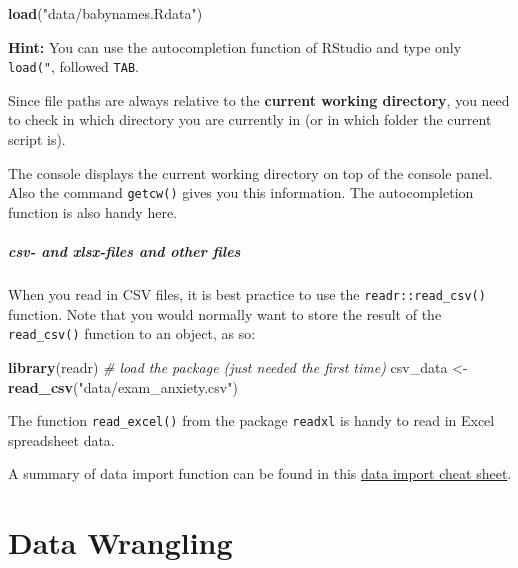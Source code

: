 \documentclass[
]{scrartcl}
\makeatletter
\newenvironment{Shaded}{\begin{snugshade}}{\end{snugshade}}
\newcommand{\CommentTok}[1]{\textcolor[rgb]{0.56,0.35,0.01}{\textit{#1}}}
\newcommand{\FunctionTok}[1]{\textcolor[rgb]{0.13,0.29,0.53}{\textbf{#1}}}
\newcommand{\NormalTok}[1]{#1}
\newcommand{\OtherTok}[1]{\textcolor[rgb]{0.56,0.35,0.01}{#1}}
\newcommand{\StringTok}[1]{\textcolor[rgb]{0.31,0.60,0.02}{#1}}
\newenvironment{kframe}{%
\medskip{}
\setlength{\fboxsep}{.8em}
 \def\at@end@of@kframe{}%
 \ifinner\ifhmode%
  \def\at@end@of@kframe{\end{minipage}}%
  \begin{minipage}{\columnwidth}%
 \fi\fi%
 \def\FrameCommand##1{\hskip\@totalleftmargin \hskip-\fboxsep
 \colorbox{shadecolor}{##1}\hskip-\fboxsep
     \hskip-\linewidth \hskip-\@totalleftmargin \hskip\columnwidth}%
 \MakeFramed {\advance\hsize-\width
   \@totalleftmargin\z@ \linewidth\hsize
   \@setminipage}}%
 {\par\unskip\endMakeFramed%
 \at@end@of@kframe}
\newenvironment{rmdblock}[1]
  {
  \begin{itemize}
  \renewcommand{\labelitemi}{
    \raisebox{-.7\height}[0pt][0pt]{
      {\setkeys{Gin}{width=3em,keepaspectratio}\texttt{[image: images/\#1]}}
    }
  }
  \setlength{\fboxsep}{1em}
  \begin{kframe}
  \item
  }
  {
  \end{kframe}
  \end{itemize}
  }
\newenvironment{important}
    {\begin{rmdblock}{hint}}
    {\end{rmdblock}}
\makeatother
\begin{document}
\begin{Shaded}
\begin{Highlighting}[]
\FunctionTok{load}\NormalTok{(}\StringTok{"data/babynames.Rdata"}\NormalTok{)}
\end{Highlighting}
\end{Shaded}

\textbf{Hint:} You can use the autocompletion function of RStudio and type only \texttt{load("}, followed \texttt{TAB}.

\begin{important}
Since file paths are always relative to the \textbf{current working
directory}, you need to check in which directory you are currently in
(or in which folder the current script is).

The console displays the current working directory on top of the console
panel. Also the command \texttt{getcw()} gives you this information. The
autocompletion function is also handy here.
\end{important}

\subsubsection*{csv- and xlsx-files and other files}\label{csv--and-xlsx-files-and-other-files}

When you read in CSV files, it is best practice to use the \texttt{readr::read\_csv()} function. Note that you would normally want to store the result of the \texttt{read\_csv()} function to an object, as so:

\begin{Shaded}
\begin{Highlighting}[]
\FunctionTok{library}\NormalTok{(readr) }\CommentTok{\# load the package (just needed the first time)}
\NormalTok{csv\_data }\OtherTok{\textless{}{-}} \FunctionTok{read\_csv}\NormalTok{(}\StringTok{"data/exam\_anxiety.csv"}\NormalTok{)}
\end{Highlighting}
\end{Shaded}

The function \texttt{read\_excel()} from the package \texttt{readxl} is handy to read in Excel spreadsheet data.

A summary of data import function can be found in this \hyperref[cheatsheets]{data import cheat sheet}.

\newpage

\part{Data Wrangling}\label{part-data-wrangling}
\end{document}
